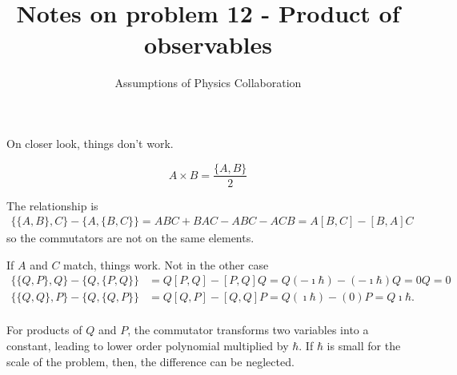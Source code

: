 \documentclass[11pt]{article}
\begin{document}
	\title{Notes on problem 12 - Product of observables}
	\author{Assumptions of Physics Collaboration}

	\date{}

	\maketitle

On closer look, things don't work.

\begin{equation}
	A \times B = \frac{\{A, B\}}{2}
\end{equation}

The relationship is
\begin{equation}
	\begin{aligned}
	\{\{A, B\}, C\} - \{A, \{B, C\}\} = ABC+BAC-ABC-ACB = A[B,C] - [B,A]C
	\end{aligned}
\end{equation}
so the commutators are not on the same elements.

If $A$ and $C$ match, things work. Not in the other case
\begin{equation}
\begin{aligned}
	\{\{Q, P\}, Q\} - \{Q, \{P, Q\}\} &= Q[P,Q] - [P,Q]Q = Q (- \imath \hbar) - (-\imath \hbar)Q = 0 Q = 0 \\
	\{\{Q, Q\}, P\} - \{Q, \{Q, P\}\} &= Q[Q,P] - [Q,Q]P = Q (\imath \hbar) - (0) P = Q \imath \hbar. \\
\end{aligned}
\end{equation}

For products of $Q$ and $P$, the commutator transforms two variables into a constant, leading to lower order polynomial multiplied by $\hbar$. If $\hbar$ is small for the scale of the problem, then, the difference can be neglected.
\end{document}
